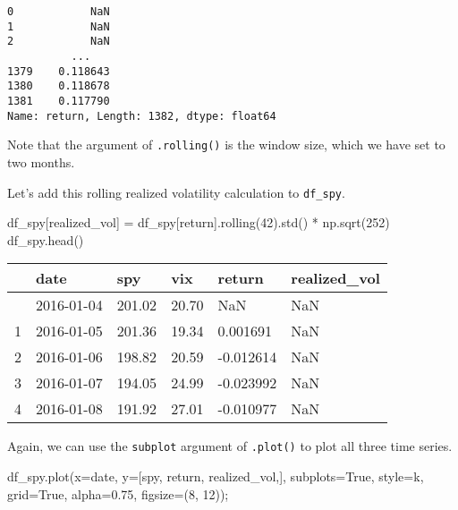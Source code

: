 \documentclass[
  letterpaper,
  DIV=11,
  numbers=noendperiod]{scrreprt}
\newenvironment{Shaded}{\begin{snugshade}}{\end{snugshade}}
\newcommand{\DecValTok}[1]{\textcolor[rgb]{0.68,0.00,0.00}{#1}}
\newcommand{\FloatTok}[1]{\textcolor[rgb]{0.68,0.00,0.00}{#1}}
\newcommand{\NormalTok}[1]{\textcolor[rgb]{0.00,0.23,0.31}{#1}}
\newcommand{\OperatorTok}[1]{\textcolor[rgb]{0.37,0.37,0.37}{#1}}
\newcommand{\StringTok}[1]{\textcolor[rgb]{0.13,0.47,0.30}{#1}}
\newcommand{\VariableTok}[1]{\textcolor[rgb]{0.07,0.07,0.07}{#1}}
\begin{document}
\begin{verbatim}
0            NaN
1            NaN
2            NaN
          ...   
1379    0.118643
1380    0.118678
1381    0.117790
Name: return, Length: 1382, dtype: float64
\end{verbatim}

Note that the argument of \texttt{.rolling()} is the window size, which
we have set to two months.

Let's add this rolling realized volatility calculation to
\texttt{df\_spy}.

\begin{Shaded}
\begin{Highlighting}[]
\NormalTok{df\_spy[}\StringTok{\textquotesingle{}realized\_vol\textquotesingle{}}\NormalTok{] }\OperatorTok{=}\NormalTok{ df\_spy[}\StringTok{\textquotesingle{}return\textquotesingle{}}\NormalTok{].rolling(}\DecValTok{42}\NormalTok{).std() }\OperatorTok{*}\NormalTok{ np.sqrt(}\DecValTok{252}\NormalTok{)}
\NormalTok{df\_spy.head()}
\end{Highlighting}
\end{Shaded}

\begin{longtable}[]{@{}llllll@{}}
\toprule\noalign{}
& date & spy & vix & return & realized\_vol \\
\midrule\noalign{}
\endhead
\bottomrule\noalign{}
\endlastfoot
0 & 2016-01-04 & 201.02 & 20.70 & NaN & NaN \\
1 & 2016-01-05 & 201.36 & 19.34 & 0.001691 & NaN \\
2 & 2016-01-06 & 198.82 & 20.59 & -0.012614 & NaN \\
3 & 2016-01-07 & 194.05 & 24.99 & -0.023992 & NaN \\
4 & 2016-01-08 & 191.92 & 27.01 & -0.010977 & NaN \\
\end{longtable}

Again, we can use the \texttt{subplot} argument of \texttt{.plot()} to
plot all three time series.

\begin{Shaded}
\begin{Highlighting}[]
\NormalTok{df\_spy.plot(x}\OperatorTok{=}\StringTok{\textquotesingle{}date\textquotesingle{}}\NormalTok{, y}\OperatorTok{=}\NormalTok{[}\StringTok{\textquotesingle{}spy\textquotesingle{}}\NormalTok{, }\StringTok{\textquotesingle{}return\textquotesingle{}}\NormalTok{, }\StringTok{\textquotesingle{}realized\_vol\textquotesingle{}}\NormalTok{,], subplots}\OperatorTok{=}\VariableTok{True}\NormalTok{, style}\OperatorTok{=}\StringTok{\textquotesingle{}k\textquotesingle{}}\NormalTok{, grid}\OperatorTok{=}\VariableTok{True}\NormalTok{, alpha}\OperatorTok{=}\FloatTok{0.75}\NormalTok{, figsize}\OperatorTok{=}\NormalTok{(}\DecValTok{8}\NormalTok{, }\DecValTok{12}\NormalTok{))}\OperatorTok{;}
\end{Highlighting}
\end{Shaded}
\end{document}
